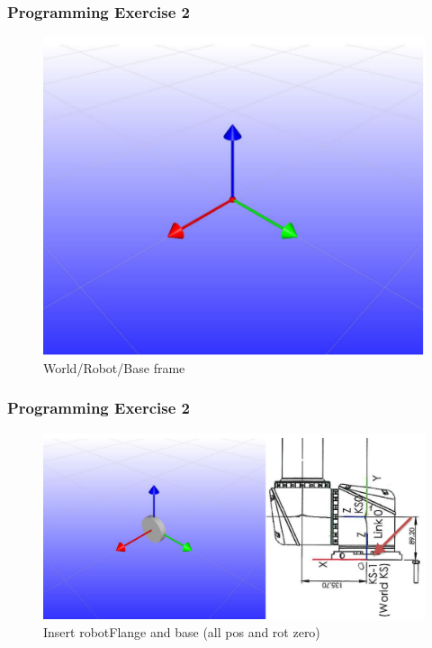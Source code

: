 \documentclass{beamer}
\begin{document}
\begin{frame}
  \frametitle{Programming Exercise 2}
  \begin{centering}
    \begin{figure}
    \includegraphics[height=0.6\textheight]{./graphics/ex33_1}
    \caption{World/Robot/Base frame}
    \end{figure}
    \end{centering}
\end{frame}



\begin{frame}
  \frametitle{Programming Exercise 2}
  \begin{centering}
    \begin{figure}
    \includegraphics[height=0.6\textheight]{./graphics/ex33_2}
    \caption{Insert robotFlange and base (all pos and rot zero)}
    \end{figure}
    \end{centering}
  \end{frame}
  
\end{document}
